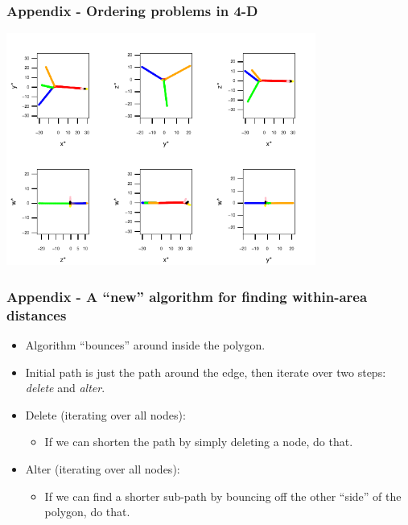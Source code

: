 \documentclass[ignorenonframetext]{beamer} %
\newcommand{\bi}{\begin{itemize}}
\newcommand{\ei}{\end{itemize}}
\begin{document}
\begin{frame}
	\frametitle{Appendix - Ordering problems in 4-D}
	\centering
            \includegraphics[height=3in]{figs/comb-4d.pdf}	
\end{frame}

\begin{frame}
	\frametitle{Appendix - A ``new'' algorithm for finding within-area distances}
	\bi
		\item Algorithm ``bounces'' around inside the polygon.
		\item Initial path is just the path around the edge, then iterate over two steps: \textit{delete} and \textit{alter}.
		\item Delete (iterating over all nodes):
			\bi \item If we can shorten the path by simply deleting a node, do that.
			\ei
		\item Alter (iterating over all nodes):
			\bi \item If we can find a shorter sub-path by bouncing off the other ``side'' of the polygon, do that.
			\ei
	\ei
\end{frame}
\end{document}

